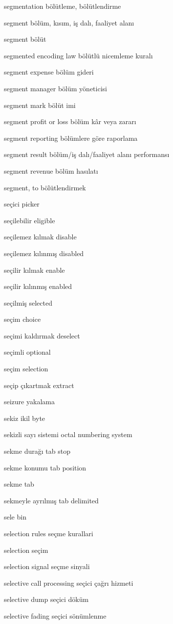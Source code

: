 \documentclass[12pt,fleqn]{article}\usepackage{../../common}
\begin{document}
segmentation bölütleme, bölütlendirme

segment bölüm, kısım, iş dalı, faaliyet alanı

segment bölüt

segmented encoding law bölütlü nicemleme kuralı

segment expense bölüm gideri

segment manager bölüm yöneticisi

segment mark bölüt imi

segment profit or loss bölüm kâr veya zararı

segment reporting bölümlere göre raporlama

segment result bölüm/iş dalı/faaliyet alanı performansı

segment revenue bölüm hasılatı

segment, to bölütlendirmek

seçici picker

seçilebilir eligible

seçilemez kılmak disable

seçilemez kılınmış disabled

seçilir kılmak enable

seçilir kılınmış enabled

seçilmiş selected

seçim choice

seçimi kaldırmak deselect

seçimli optional

seçim selection

seçip çıkartmak extract

seizure yakalama

sekiz ikil byte

sekizli sayı sistemi octal numbering system

sekme durağı tab stop

sekme konumu tab position

sekme tab

sekmeyle ayrılmış tab delimited

sele bin

selection rules seçme kurallari

selection seçim

selection signal seçme sinyali

selective call processing seçici çağrı hizmeti

selective dump seçici döküm

selective fading seçici sönümlenme
\end{document}
